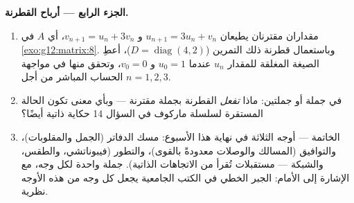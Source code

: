 \begin{problem}
\medskip
\noindent\textbf{الجزء الرابع --- أرباح القطرنة.}
\begin{enumerate}[resume]
  \item مقداران مقترنان يطيعان
        $u_{n+1} = 3u_n + v_n$ و $v_{n+1} = u_n + 3v_n$، أي
         $A$ في \cref{exo:g12:matrix:8}. وباستعمال
        قطرنة ذلك التمرين
        ($D = \operatorname{diag}(4, 2)$)، أعطِ الصيغة
        المغلقة للمقدار $u_n$ عندما $u_0 = 1$ و $v_0 = 0$، وتحقق
        منها في مواجهة الحساب المباشر من أجل $n = 1, 2, 3$.
  \item في جملة أو جملتين: ماذا \emph{تفعل} القطرنة
        بجملة مقترنة --- وبأي معنى تكون الحالة المستقرة
        لسلسلة ماركوف في السؤال 14 حكاية  ذاتية أيضًا؟
  \item الخاتمة --- أوجه  الثلاثة في نهاية هذا الأسبوع:
        مسك الدفاتر (الجمل والمقلوبات)، والتوافيق
        (المسالك والوصلات معدودةً بالقوى)، والتطور
        (فيبوناتشي، والطقس، والشبكة --- مستقبلات تُقرأ
        من الاتجاهات الذاتية). جملة واحدة لكل وجه، مع
        الإشارة إلى الأمام: الجبر الخطي في الكتب الجامعية
        يجعل كل وجه من هذه الأوجه نظرية.
\end{enumerate}
\end{problem}
